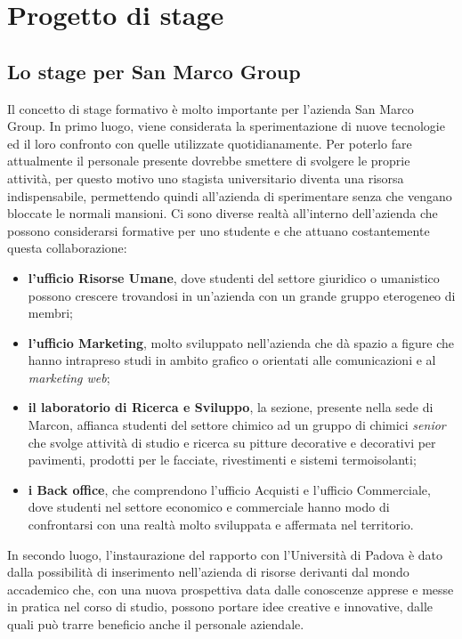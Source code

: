 
\chapter{Progetto di stage}
\label{cap:progetto-di-stage}


\section{Lo stage per San Marco Group}

Il concetto di stage formativo è molto importante per l'azienda San Marco Group. 
In primo luogo, viene considerata la sperimentazione di nuove tecnologie ed il loro confronto con quelle utilizzate quotidianamente. Per poterlo fare attualmente il personale presente dovrebbe smettere di svolgere le proprie attività, per questo motivo uno stagista universitario diventa una risorsa indispensabile, permettendo quindi all'azienda di sperimentare senza che vengano bloccate le normali mansioni.
Ci sono diverse realtà all'interno dell'azienda che possono considerarsi formative per uno studente e che attuano costantemente questa collaborazione:
\begin{itemize}
	\item \textbf{l'ufficio Risorse Umane}, dove studenti del settore giuridico o umanistico possono crescere trovandosi in un'azienda con un grande gruppo eterogeneo di membri; 
	\item \textbf{l'ufficio Marketing}, molto sviluppato nell'azienda che dà spazio a figure che hanno intrapreso studi in ambito grafico o orientati alle comunicazioni e al \textit{marketing web};
	\item \textbf{il laboratorio di Ricerca e Sviluppo}, la sezione, presente nella sede di Marcon, affianca studenti del settore chimico ad un gruppo di chimici \textit{senior} che svolge attività di studio e ricerca su pitture decorative e decorativi per pavimenti, prodotti per le facciate, rivestimenti e sistemi termoisolanti; 
	\item \textbf{i Back office}, che comprendono l'ufficio Acquisti e l'ufficio Commerciale, dove studenti nel settore economico e commerciale hanno modo di confrontarsi con una realtà molto sviluppata e affermata nel territorio.
\end{itemize}
In secondo luogo, l'instaurazione del rapporto con l'Università di Padova è dato dalla possibilità di inserimento nell'azienda di risorse derivanti dal mondo accademico che, con una nuova prospettiva data dalle conoscenze apprese e messe in pratica nel corso di studio, possono portare idee creative e innovative, dalle quali può trarre beneficio anche il personale aziendale.

